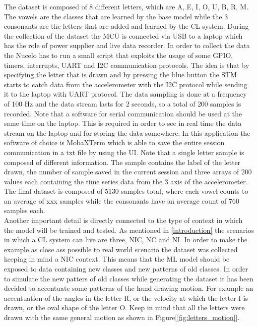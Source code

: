 \documentclass[12pt]{report}
\begin{document}
The dataset is composed of 8 different letters, which are A, E, I, O, U, B, R, M. The vowels are the classes that are learned by the base model while the 3 consonants are the letters that are added and learned by the CL system. During the collection of the dataset the MCU is connected via USB to a laptop which has the role of power supplier and live data recorder. In order to collect the data the Nucelo has to run a small script that exploits the usage of some GPIO, timers, interrupts, UART and I2C communication protocols. The idea is that by specifying the letter that is drawn and by pressing the blue button the STM starts to catch data from the accelerometer with the I2C protocol while sending it to the laptop with UART protocol. The data sampling is done at a frequency of 100 Hz and the data stream lasts for 2 seconds, so a total of 200 samples is recorded. Note that a software for serial communication should be used at the same time on the laptop. This is required in order to see in real time the data stream on the laptop and for storing the data somewhere. In this application the software of choice is MobaXTerm which is able to save the entire session communication in a txt file by using the UI. 
Note that a single letter sample is composed of different information. The sample contains the label of the letter drawn, the number of sample saved in the current session and three arrays of 200 values each containing the time series data from the 3 axis of the accelerometer. The final dataset is composed of 5130 samples total, where each vowel counts to an average of xxx samples while the consonants have an average count of 760 samples each. \\
Another important detail is directly connected to the type of context in which the model will be trained and tested. As mentioned in \ref{introduction} the scenarios in which a CL system can live are three, NIC, NC and NI. In order to make the example as close ass possible to real world scenario the dataset was collected keeping in mind a NIC context. This means that the ML model should be exposed to data containing new classes and new patterns of old classes. In order to simulate the new patters of old classes while generating the dataset it has been decided to accentuate some patterns of the hand drawing motion. For example an accentuation of the angles in the letter R, or the velocity at which the letter I is drawn, or the oval shape of the letter O. Keep in mind that all the letters were drawn with the same general motion as shown in Figure[\ref{fig:letters_motion}].\\
\end{document}
